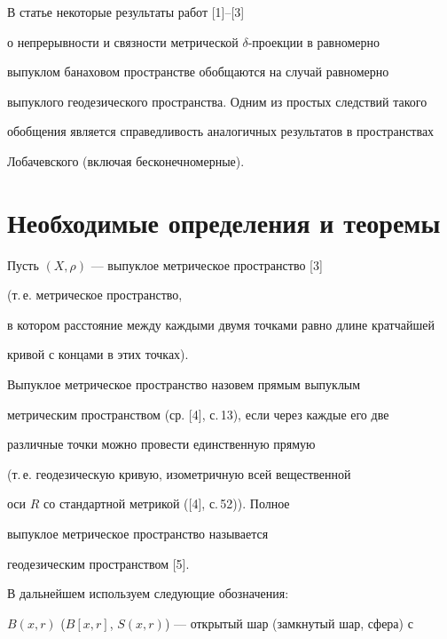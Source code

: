 \maketitle


\label{begin}





В статье некоторые результаты работ [1]--[3]


о непрерывности и связности метрической $\delta $-проекции в равномерно


выпуклом банаховом пространстве обобщаются на случай равномерно


выпуклого геодезического пространства. Одним из простых следствий такого


обобщения является справедливость аналогичных результатов в пространствах


Лобачевского (включая бесконечномерные). 





\section{Необходимые определения и теоремы}





Пусть $(X,\rho )$ --- выпуклое метрическое пространство [3]


(т.\,е. метрическое пространство,


в котором расстояние между каждыми двумя точками равно длине кратчайшей


кривой с концами в этих точках).


Выпуклое метрическое пространство назовем прямым выпуклым 


метрическим пространством (ср. [4], с.\,13), если через каждые его две 


различные точки можно провести единственную прямую


(т.\,е. геодезическую кривую, изометричную всей вещественной 


оси $R$ со стандартной метрикой ([4], с.\,52)). Полное 


выпуклое метрическое пространство называется 


геодезическим пространством [5].





В дальнейшем используем следующие обозначения:


$B(x,r)$ ($B[x,r]$, $S(x,r)$) --- открытый шар (замкнутый шар, сфера) с


